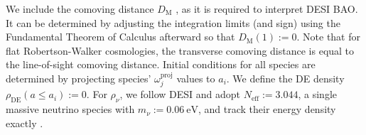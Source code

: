 \documentclass[a4paper,11pt]{article}
\begin{document}
We include the comoving distance $D_\mathrm{M}$ \cite[e.g.][]{hoggdistance}, as it is required to interpret DESI BAO.
It can be determined by adjusting the integration limits (and sign) using the Fundamental Theorem of Calculus afterward so that $D_\mathrm{M}(1) := 0$.
Note that for flat Robertson-Walker cosmologies, the transverse comoving distance is equal to the line-of-sight comoving distance.
Initial conditions for all species are determined by projecting species' $\omega_j^\mathrm{proj}$ values to $a_i$.
We define the DE density $\rho_\mathrm{DE}(a \leqslant a_i) := 0$.
For $\rho_\nu$, we follow DESI \cite{desicollaboration2024desi} and adopt $N_\mathrm{eff} := 3.044$, a single massive neutrino species with $m_\nu := 0.06~\mathrm{eV}$, and track their energy density exactly \cite[e.g.][\S3.3]{Komatsu2011WMAP}.
\end{document}
